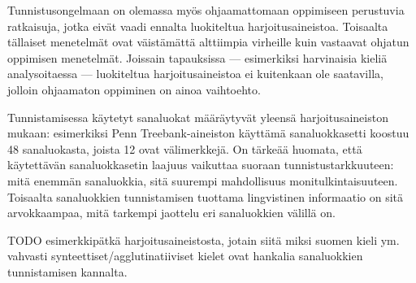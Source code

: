 \documentclass[utf8,bachelor,manualbib]{gradu3}
\begin{document}
Tunnistusongelmaan on olemassa myös ohjaamattomaan oppimiseen perustuvia ratkaisuja, jotka eivät vaadi ennalta luokiteltua harjoitusaineistoa. Toisaalta tällaiset menetelmät ovat väistämättä alttiimpia virheille kuin vastaavat ohjatun oppimisen menetelmät. Joissain tapauksissa --- esimerkiksi harvinaisia kieliä analysoitaessa --- luokiteltua harjoitusaineistoa ei kuitenkaan ole saatavilla, jolloin ohjaamaton oppiminen on ainoa vaihtoehto.

Tunnistamisessa käytetyt sanaluokat määräytyvät yleensä harjoitusaineiston mukaan: esimerkiksi Penn Treebank-aineiston käyttämä sanaluokkasetti koostuu 48 sanaluokasta, joista 12 ovat välimerkkejä. On tärkeää huomata, että käytettävän sanaluokkasetin laajuus vaikuttaa suoraan tunnistustarkkuuteen: mitä enemmän sanaluokkia, sitä suurempi mahdollisuus monitulkintaisuuteen. Toisaalta sanaluokkien tunnistamisen tuottama lingvistinen informaatio on sitä arvokkaampaa, mitä tarkempi jaottelu eri sanaluokkien välillä on. \citep{marcus1993}

TODO esimerkkipätkä harjoitusaineistosta, jotain siitä miksi suomen kieli ym. vahvasti synteettiset/agglutinatiiviset kielet ovat hankalia sanaluokkien tunnistamisen kannalta.
\end{document}
